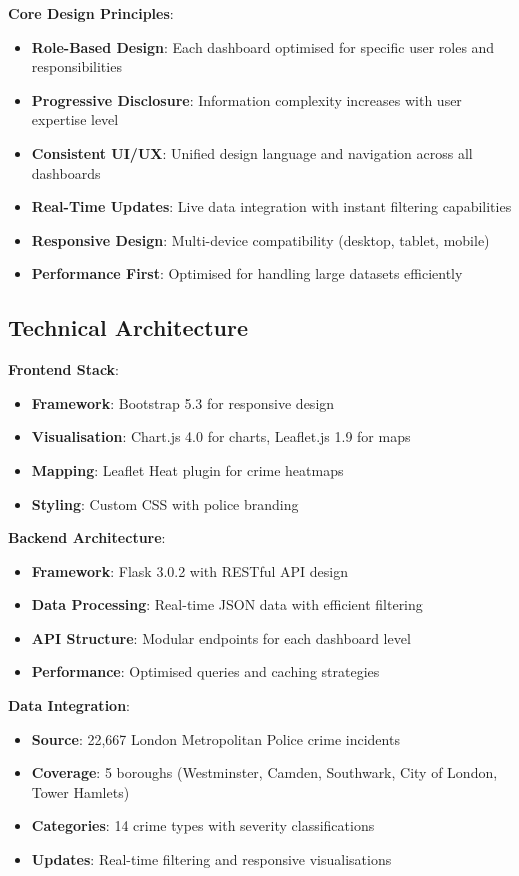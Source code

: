 \documentclass[12pt,a4paper]{article}
\begin{document}
\textbf{Core Design Principles}:
\begin{itemize}
    \item \textbf{Role-Based Design}: Each dashboard optimised for specific user roles and responsibilities
    \item \textbf{Progressive Disclosure}: Information complexity increases with user expertise level
    \item \textbf{Consistent UI/UX}: Unified design language and navigation across all dashboards
    \item \textbf{Real-Time Updates}: Live data integration with instant filtering capabilities
    \item \textbf{Responsive Design}: Multi-device compatibility (desktop, tablet, mobile)
    \item \textbf{Performance First}: Optimised for handling large datasets efficiently
\end{itemize}

\subsection{Technical Architecture}

\textbf{Frontend Stack}:
\begin{itemize}
    \item \textbf{Framework}: Bootstrap 5.3 for responsive design
    \item \textbf{Visualisation}: Chart.js 4.0 for charts, Leaflet.js 1.9 for maps
    \item \textbf{Mapping}: Leaflet Heat plugin for crime heatmaps
    \item \textbf{Styling}: Custom CSS with police branding
\end{itemize}

\textbf{Backend Architecture}:
\begin{itemize}
    \item \textbf{Framework}: Flask 3.0.2 with RESTful API design
    \item \textbf{Data Processing}: Real-time JSON data with efficient filtering
    \item \textbf{API Structure}: Modular endpoints for each dashboard level
    \item \textbf{Performance}: Optimised queries and caching strategies
\end{itemize}

\textbf{Data Integration}:
\begin{itemize}
    \item \textbf{Source}: 22,667 London Metropolitan Police crime incidents
    \item \textbf{Coverage}: 5 boroughs (Westminster, Camden, Southwark, City of London, Tower Hamlets)
    \item \textbf{Categories}: 14 crime types with severity classifications
    \item \textbf{Updates}: Real-time filtering and responsive visualisations
\end{itemize}
\end{document}
